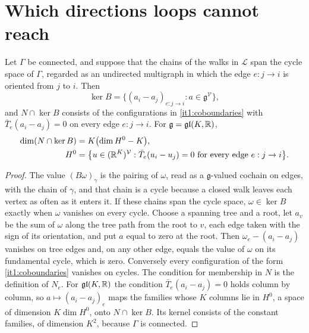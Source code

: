 \documentclass[11pt,letterpaper]{report}
\begin{document}
\section{Which directions loops cannot reach}

Let $\Gamma$ be connected, and suppose that the chains of the walks in $\mathcal L$ span the cycle space of $\Gamma$, regarded as an undirected multigraph in which the edge $e:j\to i$ is oriented from $j$ to $i$. Then
\begin{equation}
\ker B=\bigl\{(a_i-a_j)_{e:j\to i}:a\in\mathfrak g^{\mathcal V}\bigr\},
\label{it1:coboundaries}
\end{equation}
and $N\cap\ker B$ consists of the configurations in \cref{it1:coboundaries} with $\bar T_e(a_i-a_j)=0$ on every edge $e:j\to i$. For $\mathfrak g=\mathfrak{gl}(K,\mathbb R)$,
\begin{equation}
\begin{aligned}
\dim(N\cap\ker B)&=K\bigl(\dim H^0-K\bigr),\\
H^0&=\bigl\{u\in(\mathbb R^K)^{\mathcal V}:\bar T_e(u_i-u_j)=0\text{ for every edge }e:j\to i\bigr\}.
\end{aligned}
\label{it1:sheaf-count}
\end{equation}
\begin{proof}
The value $(B\omega)_\gamma$ is the pairing of $\omega$, read as a $\mathfrak g$-valued cochain on edges, with the chain of $\gamma$, and that chain is a cycle because a closed walk leaves each vertex as often as it enters it. If these chains span the cycle space, $\omega\in\ker B$ exactly when $\omega$ vanishes on every cycle. Choose a spanning tree and a root, let $a_v$ be the sum of $\omega$ along the tree path from the root to $v$, each edge taken with the sign of its orientation, and put $a$ equal to zero at the root. Then $\omega_e-(a_i-a_j)$ vanishes on tree edges and, on any other edge, equals the value of $\omega$ on its fundamental cycle, which is zero. Conversely every configuration of the form \cref{it1:coboundaries} vanishes on cycles. The condition for membership in $N$ is the definition of $N_e$. For $\mathfrak{gl}(K,\mathbb R)$ the condition $\bar T_e(a_i-a_j)=0$ holds column by column, so $a\mapsto(a_i-a_j)_e$ maps the families whose $K$ columns lie in $H^0$, a space of dimension $K\dim H^0$, onto $N\cap\ker B$. Its kernel consists of the constant families, of dimension $K^2$, because $\Gamma$ is connected.
\end{proof}
\end{document}
